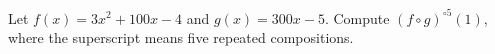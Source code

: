 Let $f(x)=3x^2+100x-4$ and $g(x)=300x-5$. Compute $(f\circ g)^{\circ5}(1)$, where the superscript means five repeated compositions.
